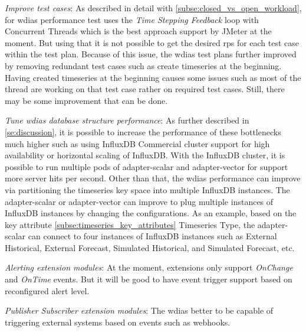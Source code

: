 \emph{Improve test cases}:
As described in detail with \cref{subse:closed_vs_open_workload}, for \acrshort{wdias} performance test uses the \emph{Time Stepping Feedback} loop with Concurrent Threads which is the best approach support by  JMeter at the moment. But using that it is not possible to get the desired \acrshort{rps} for each test case within the test plan.
Because of this issue, the \acrshort{wdias} test plans further improved by removing redundant test cases such as create timeseries at the beginning. Having created timeseries at the beginning causes some issues such as most of the thread are working on that test case rather on required test cases. Still, there may be some improvement that can be done. 

\emph{Tune \acrshort{wdias} database structure performance}:
As further described in \cref{se:discussion}, it is possible to increase the performance of these bottlenecks much higher such as using  InfluxDB Commercial cluster support for high availability or horizontal scaling of  InfluxDB. With the  InfluxDB cluster, it is possible to run multiple pods of adapter-scalar and adapter-vector for support more server hits per second.
Other than that, the \acrshort{wdias} performance can improve via partitioning the timeseries key space into multiple  InfluxDB instances. The adapter-scalar or adapter-vector can improve to plug multiple instances of  InfluxDB instances by changing the configurations. As an example, based on the key attribute \cref{subse:timeseries_key_attributes} Timeseries Type, the adapter-scalar can connect to four instances of  InfluxDB instances such as  External Historical, External Forecast, Simulated Historical, and Simulated Forecast, etc.

\emph{Alerting extension modules}:
At the moment, extensions only support \emph{OnChange} and \emph{OnTime} events. But it will be good to have event trigger support based on reconfigured alert level.

\emph{Publisher Subscriber extension modules}:
The \acrshort{wdias} better to be capable of triggering external systems based on events such as webhooks.

